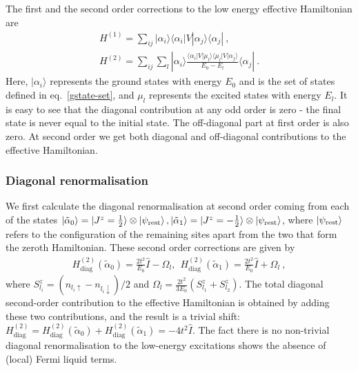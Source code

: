 \documentclass{iopart}
\begin{document}
The first and the second order corrections to the low energy effective Hamiltonian are
\begin{eqnarray}
H^{(1)} = \sum_{ij} |\alpha_i\rangle \langle \alpha_i  | V| \alpha_j \rangle \langle \alpha_j |~,\nonumber\\
H^{(2)} = \sum_{ij} \sum_l |\alpha_i\rangle \frac{\langle \alpha_i  | V| \mu_l \rangle \langle \mu_l  | V| \alpha_j \rangle}{E_0-E_{l}}\langle \alpha_j |~.
\end{eqnarray}
Here, $|\alpha_i\rangle$ represents the ground states with energy $E_0$ and is the set of states defined in eq.~\ref{gstate-set}, and $\mu_l$ represents the excited states with energy $E_l$. It is easy to see that the diagonal contribution at any odd order is zero - the final state is never equal to the initial state. The off-diagonal part at first order is also zero. At second order we get both diagonal and off-diagonal contributions to the effective Hamiltonian. 

\subsubsection{Diagonal renormalisation}
We first calculate the diagonal renormalisation at second order coming from each of the states \(\ket{\tilde \alpha_0} = \ket{J^z = \frac{1}{2}}\otimes\ket{\psi_\mathrm{rest}}, \ket{\tilde \alpha_1} = \ket{J^z = -\frac{1}{2}}\otimes\ket{\psi_\mathrm{rest}}\), where \(\ket{\psi_\mathrm{rest}}\) refers to the configuration of the remaining sites apart from the two that form the zeroth Hamiltonian. These second order corrections are given by
\begin{eqnarray}
H^{(2)}_\mathrm{diag}\left(\tilde \alpha_0\right)  = \frac{2t^2}{E_0} \hat{I} - \Omega_l, ~ ~ H^{(2)}_\mathrm{diag}\left(\tilde \alpha_1\right) = \frac{2t^2}{E_0} \hat{I} + \Omega_l ~,
\end{eqnarray}
where $S_{l_i}^z=(n_{l_i\uparrow}-n_{l_i\downarrow})/2$ and $\Omega_l=\frac{2t^2}{3E_0} ( S_{l_1}^z + S_{l_2}^z)$.  The total diagonal second-order contribution to the effective Hamiltonian is obtained by adding these two contributions, and the result is a trivial shift: $H^{(2)}_\mathrm{diag} = H^{(2)}_\mathrm{diag}\left(\tilde \alpha_0\right) + H^{(2)}_\mathrm{diag}\left(\tilde \alpha_1\right) = -4t^2 \hat{I}$. The fact there is no non-trivial diagonal renormalisation to the low-energy excitations shows the absence of (local) Fermi liquid terms.
\end{document}
